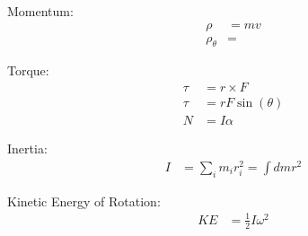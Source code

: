 \documentclass[10pt, letterpaper]{book}
\begin{document}
\begin{multicols*}{2}
        Momentum:
        \begin{align}
            \rho            & = mv          \\
            \rho_{\theta}   & =
        \end{align}

        Torque:
        \begin{align}
            \tau & = r \times F     \\
            \tau & = rF\sin(\theta) \\
            N    & = I\alpha        
        \end{align}

        Inertia:
        \begin{align}
            I   & = \sum_{i}m_{i}r_{i}^{2} = \int dmr^{2}
        \end{align}

        Kinetic Energy of Rotation:
        \begin{align}
            KE  & = \frac{1}{2}I\omega^{2}
        \end{align}
    \end{multicols*}

    \pagebreak
\end{document}
